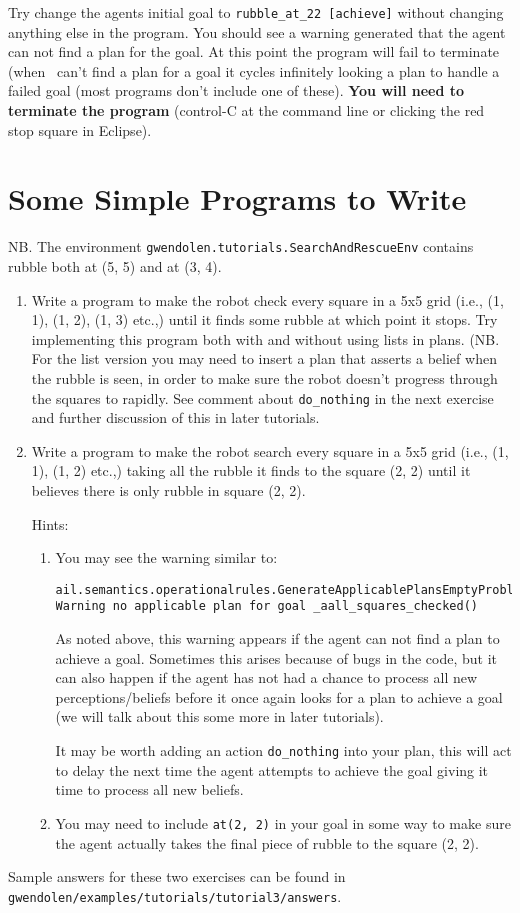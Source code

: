 Try change the agents initial goal to \lstinline{rubble_at_22 [achieve]} without changing anything else in the program.  You should see a warning generated that the agent can not find a plan for the goal.  At this point the program will fail to terminate (when \gwendolen\ can't find a plan for a goal it cycles infinitely looking a plan to handle a failed goal (most programs don't include one of these).  {\bf You will need to terminate the program} (control-C at the command line or clicking the red stop square in Eclipse).

\section{Some Simple Programs to Write}
NB.  The environment \texttt{gwendolen.tutorials.SearchAndRescueEnv} contains rubble both at (5, 5) and at (3, 4).
\begin{enumerate}
\item Write a program to make the robot check every square in a 5x5 grid (i.e., (1, 1), (1, 2), (1, 3) etc.,) until it finds some rubble at which point it stops.  Try implementing this program both with and without using lists in plans.  (NB.  For the list version you may need to insert a plan that asserts a belief when the rubble is seen, in order to make sure the robot doesn't progress through the squares to rapidly.  See comment about \lstinline{do_nothing} in the next exercise and further discussion of this in later tutorials.
\item Write a program to make the robot search every square in a 5x5 grid (i.e., (1, 1), (1, 2) etc.,) taking all the rubble it finds to the square (2, 2) until it believes there is only rubble in square (2, 2).

Hints:
\begin{enumerate}
\item You may see the warning similar to:
\begin{small}
\begin{verbatim}
ail.semantics.operationalrules.GenerateApplicablePlansEmptyProblemGoal[WARNING|main|2:09:29]: 
Warning no applicable plan for goal _aall_squares_checked() 
\end{verbatim}
\end{small}
As noted above, this warning appears if the agent can not find a plan to achieve a goal.  Sometimes this arises because of bugs in the code, but it can also happen if the agent has not had a chance to process all new perceptions/beliefs before it once again looks for a plan to achieve a goal (we will talk about this some more in later tutorials).  

It may be worth adding an action \lstinline{do_nothing} into your plan, this will act to delay the next time the agent attempts to achieve the goal giving it time to process all new beliefs.
\item You may need to include \lstinline{at(2, 2)} in your goal in some way to make sure the agent actually takes the final piece of rubble to the square (2, 2).
\end{enumerate}
\end{enumerate}
\begin{sloppypar}
Sample answers for these two exercises can be found in \texttt{gwendolen/examples/tutorials/tutorial3/answers}.
\end{sloppypar}
